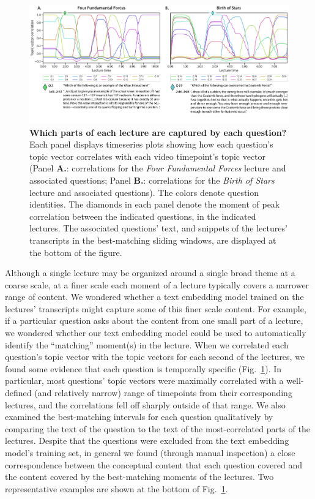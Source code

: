 \documentclass[10pt]{article}
\begin{document}
\begin{figure}[tp]
    \centering
    \includegraphics[width=\textwidth]{figs/lecture-question-similarity}
    
    \caption{\textbf{Which parts of each lecture are captured by each
    question?} Each panel displays timeseries plots showing how each question's
    topic vector correlates with each video timepoint's topic vector (Panel
    \textbf{A.}: correlations for the \textit{Four Fundamental Forces} lecture
    and associated questions; Panel \textbf{B.}: correlations for the
    \textit{Birth of Stars} lecture and associated questions). The colors denote
    question identities. The diamonds in each panel denote the moment of peak
    correlation between the indicated questions, in the indicated lectures. The
    associated questions' text, and snippets of the lectures' transcripts in
    the best-matching sliding windows, are displayed at the bottom of the
    figure.}
    
    \label{fig:question-correlations}
\end{figure}

Although a single lecture may be organized around a single broad theme at a
coarse scale, at a finer scale each moment of a lecture typically covers a
narrower range of content. We wondered whether a text embedding model trained
on the lectures' transcripts might capture some of this finer scale content.
For example, if a particular question asks about the content from one small
part of a lecture, we wondered whether our text embedding model could be used
to automatically identify the ``matching'' moment(s) in the lecture. When we
correlated each question's topic vector with the topic vectors for each second
of the lectures, we found some evidence that each question is temporally
specific (Fig.~\ref{fig:question-correlations}). In particular, most questions'
topic vectors were maximally correlated with a well-defined (and relatively
narrow) range of timepoints from their corresponding lectures, and the
correlations fell off sharply outside of that range. We also examined the
best-matching intervals for each question qualitatively by comparing the text
of the question to the text of the most-correlated parts of the lectures.
Despite that the questions were excluded from the text embedding model's
training set, in general we found (through manual inspection) a close
correspondence between the conceptual content that each question covered and
the content covered by the best-matching moments of the lectures. Two
representative examples are shown at the bottom of
Fig.~\ref{fig:question-correlations}.
\end{document}
